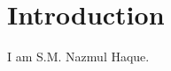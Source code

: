 \documentclass[12pt,a4paper,notitlepage]{report}
\begin{document}
\section*{Introduction}
I am S.M. Nazmul Haque.



\renewcommand\bibname{References} %


\end{document}
